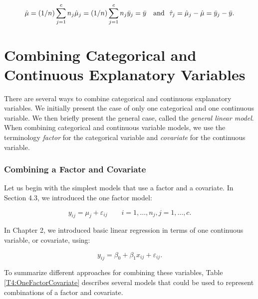 \begin{equation*}
\hat{\mu}=(1/n)\sum_{j=1}^{c}n_{j}\hat{\mu}_{j}=(1/n)\sum_{j=1}^{c}n_{j}\bar{%
y}_{j}=\bar{y}\text{ \ \ and \ }\hat{\tau}_{j}=\hat{\mu}_{j}-\hat{\mu}=\bar{y%
}_{j}-\bar{y}.
\end{equation*}

\section{Combining Categorical and Continuous Explanatory Variables}

There are several ways to combine categorical and continuous
explanatory variables. We initially present the case of only one
categorical and one continuous variable. We then briefly present the
general case, called the \textit{general linear model}. When
combining categorical and continuous variable models, we use the
terminology \emph{factor} for the categorical variable and
\emph{covariate} for the continuous variable.

\subsubsection*{Combining a Factor and Covariate}

Let us begin with the simplest models that use a factor and a
covariate. In Section 4.3, we introduced the one factor model:

\begin{equation*}
y_{ij}=\mu_{j} + \varepsilon_{ij}\qquad i=1,\ldots ,n_{j},\text{
}j=1,\ldots ,c.
\end{equation*}

In Chapter 2, we introduced basic linear regression in terms of one
continuous variable, or covariate, using:

\begin{equation*}
y_{ij}=\beta_0+\beta_1x_{ij} + \varepsilon_{ij}.
\end{equation*}

\noindent To summarize different approaches for combining these
variables, Table \ref{T4:OneFactorCovariate} describes several
models that could be used to represent combinations of a factor and
covariate.

